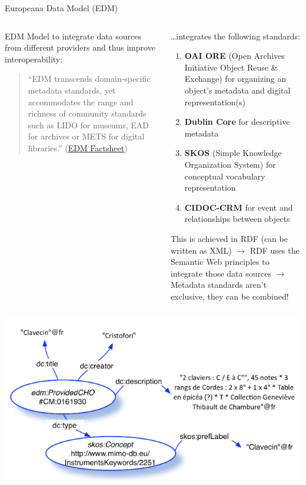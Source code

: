 
\begin{frame}[allowframebreaks]{Europeana Data Model (EDM)}
\begin{columns}
\begin{block}{EDM}
Model to integrate data sources from different providers and thus improve interoperability:
\begin{quote}
    ``EDM transcends domain-specific metadata standards, yet accommodates the range and richness of community standards such as LIDO for museums, EAD for archives or METS for digital libraries.'' (\href{https://pro.europeana.eu/files/Europeana_Professional/Share_your_data/Technical_requirements/EDM_Documentation/EDM_Factsheet.pdf}{EDM Factsheet})
\end{quote}
\end{block}

\begin{block}{}\footnotesize
\dots integrates the following standards:
\begin{enumerate}\scriptsize
\item \textbf{OAI ORE} (Open Archives Initiative Object Reuse \& Exchange) for organizing an object’s metadata and digital representation(s)
\item \textbf{Dublin Core} for descriptive metadata 
\item \textbf{SKOS} (Simple Knowledge Organization System) for conceptual vocabulary representation
\item \textbf{CIDOC-CRM} for event and relationships between objects
\end{enumerate}
This is achieved in RDF (can be written as XML) $\to$ RDF uses the Semantic Web principles to integrate those data sources $\to$ \alert{Metadata standards aren't exclusive, they can be combined!}
\end{block}
\end{columns}

\framebreak

\begin{columns}
\includegraphics[width=\textwidth]{img/edm-example1.png}


\end{columns}
\end{frame}
